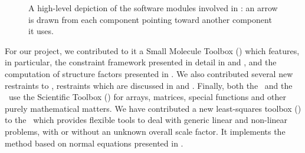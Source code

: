 \documentclass[11pt]{article}
\begin{document}
\begin{figure}
\caption{A high-level depiction of the software modules involved in \olexrefine: an arrow is drawn from each component pointing toward another component it uses.}
\label{fig:software:modules}
\end{figure}

For our project, we contributed to it a Small Molecule Toolbox (\smtbx) which features, in particular, the constraint framework presented in detail in  and , and the computation of structure factors presented in . We also contributed several new restraints to \cctbx, restraints which are discussed in  and . Finally, both the \cctbx\ and the \smtbx\ use the Scientific Toolbox (\scitbx) for arrays, matrices, special functions and other purely mathematical matters. We have contributed a new least-squares toolbox (\lstbx) to the \scitbx\ which provides flexible tools to deal with generic linear and non-linear problems, with or without an unknown overall scale factor. It implements the method based on normal equations presented in .
\end{document}
